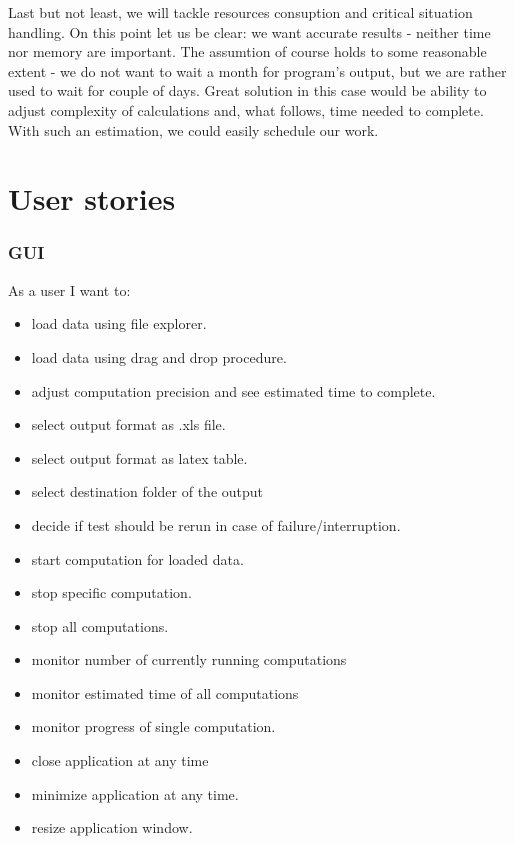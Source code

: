 \documentclass{article}
\begin{document}
Last but not least, we will tackle resources consuption and critical situation handling. On this point let us be clear: we want accurate results - neither time nor memory are important. The assumtion of course holds to some reasonable extent - we do not want to wait a month for program's output, but we are rather used to wait for couple of days. Great solution in this case would be ability to adjust complexity of calculations and, what follows, time needed to complete. With such an estimation, we could easily schedule our work.

\newpage
\section{User stories}

%
%
\subsubsection{GUI}
As a user I want to:
\begin{itemize}
	\item
		load data using file explorer.
	\item
		load data using drag and drop procedure.
	\item
		adjust computation precision and see estimated time to complete.
	\item
		select output format as .xls file.
	\item
		select output format as latex table.
	\item
		select destination folder of the output
	\item
		decide if test should be rerun in case of failure/interruption.
	\item 
		start computation for loaded data.
	\item
		stop specific computation.
	\item
		stop all computations.
	\item 
		monitor number of currently running computations
	\item
		monitor estimated time of all computations
	\item
		monitor progress of single computation.
	\item
		close application at any time
	\item
		minimize application at any time.
	\item 
		resize application window.
\end{itemize}
\end{document}

